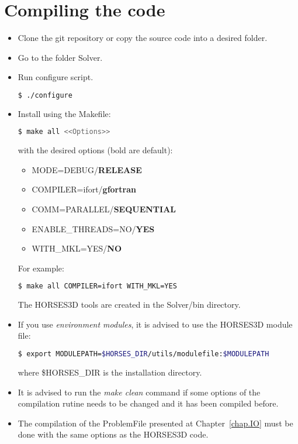 \documentclass[a4paper,10pt]{report}
\begin{document}
\chapter{Compiling the code}

\begin{itemize}
\item Clone the git repository or copy the source code into a desired folder.

\item Go to the folder Solver.

\item Run configure script.
\begin{lstlisting}[language=bash]
	$ ./configure
\end{lstlisting}
\item Install using the Makefile:
\begin{lstlisting}[language=bash]
	$ make all <<Options>>
\end{lstlisting}
with the desired options (bold are default):

\begin{itemize}
\item MODE=DEBUG/\textbf{RELEASE}
\item COMPILER=ifort/\textbf{gfortran}
\item COMM=PARALLEL/\textbf{SEQUENTIAL}
\item ENABLE\_THREADS=NO/\textbf{YES}
\item WITH\_MKL=YES/\textbf{NO}
\end{itemize}

For example:
\begin{lstlisting}[language=bash]
	$ make all COMPILER=ifort WITH_MKL=YES
\end{lstlisting}

The HORSES3D tools are created in the Solver/bin directory.

\item If you use \textit{environment modules}, it is advised to use the HORSES3D module file:\\
\begin{lstlisting}[language=bash]
	$ export MODULEPATH=$HORSES_DIR/utils/modulefile:$MODULEPATH
\end{lstlisting}
where \$HORSES\_DIR is the installation directory.

\item It is advised to run the \emph{make clean} command if some options of the compilation rutine needs to be changed and it has been compiled before.

\item The compilation of the ProblemFile presented at Chapter~\ref{chap.IO} must be done with the same options as the HORSES3D code.
\end{itemize}
\end{document}
